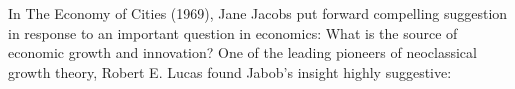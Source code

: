 

In The Economy of Cities (1969), Jane Jacobs \cite{jacobsEconomyCities1969} put forward compelling suggestion  in response to an important question in economics: What is the source of economic growth and innovation?  One of the leading pioneers of neoclassical growth theory, Robert E. Lucas \cite{lucasMechanicsEconomicDevelopment1988} found Jabob's insight highly suggestive:


